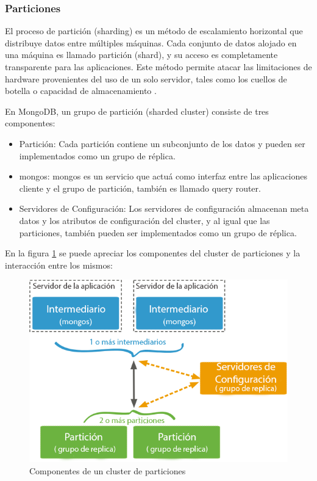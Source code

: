 \subsubsection{Particiones}

El proceso de partición (sharding) es un método de escalamiento horizontal que distribuye datos entre múltiples máquinas.
Cada conjunto de datos alojado en una máquina es llamado partición (shard), y su acceso es completamente transparente para las aplicaciones.
Este método permite atacar las limitaciones de hardware provenientes del uso de un solo servidor, tales como los cuellos de botella o capacidad de almacenamiento \cite{13}.

En MongoDB, un grupo de partición (sharded cluster) consiste de tres componentes:

\begin{itemize}
\item Partición: Cada partición contiene un subconjunto de los datos y pueden ser implementados como un grupo de réplica.

\item mongos: mongos es un servicio que actuá como interfaz entre las aplicaciones cliente y el grupo de partición, también es llamado
query router.

\item Servidores de Configuración: Los servidores de configuración almacenan meta datos y los atributos de configuración del cluster, y
al igual que las particiones, también pueden ser implementados como un grupo de réplica.
\end{itemize}

En la figura \ref{fig:sharding} se puede apreciar los componentes del cluster de particiones y la interacción entre los mismos:

\begin{figure}[H]
	\centering
		\includegraphics[width=.7\textwidth]{figures/sharding}
	\caption{Componentes de un cluster de particiones}
	\label{fig:sharding}
\end{figure}

